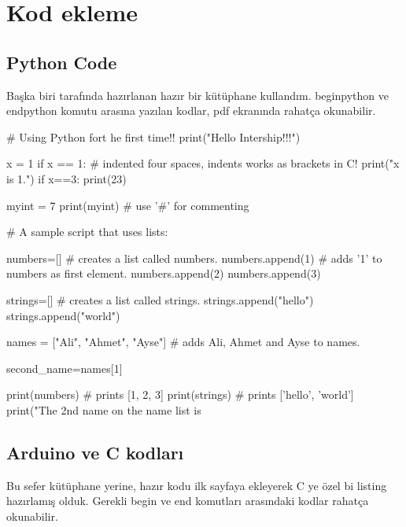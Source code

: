 \section{Kod ekleme}

\subsection{Python Code}
\- \indent
	Başka biri tarafında hazırlanan hazır bir kütüphane kullandım. begin{python} ve end{python} komutu arasına yazılan kodlar, pdf ekranında rahatça okunabilir.
	
\begin{python}
# Using Python fort he first time!! 
print("Hello Intership!!!")  

x = 1 
if x == 1:
	# indented four spaces, indents works as brackets in C!
    print("x is 1.")
if x==3:
    print(23)

myint = 7
print(myint)  # use '#' for commenting 

# A sample script that uses lists:

numbers=[]	# creates a list called numbers.
numbers.append(1)	# adds '1' to numbers as first element.
numbers.append(2)
numbers.append(3)

strings=[]  # creates a list called strings.
strings.append("hello")
strings.append("world")

names = ["Ali", "Ahmet", "Ayse"]	# adds Ali, Ahmet and Ayse to names. 

second_name=names[1]

print(numbers)	# prints [1, 2, 3]
print(strings)	# prints ['hello', 'world']
print("The 2nd name on the name list is %



\end{python}

\subsection{Arduino ve C kodları}
\- \indent
	Bu sefer kütüphane yerine, hazır kodu ilk sayfaya ekleyerek C ye özel bi listing hazırlamış olduk. Gerekli begin ve end komutları arasındaki kodlar rahatça okunabilir.
	

